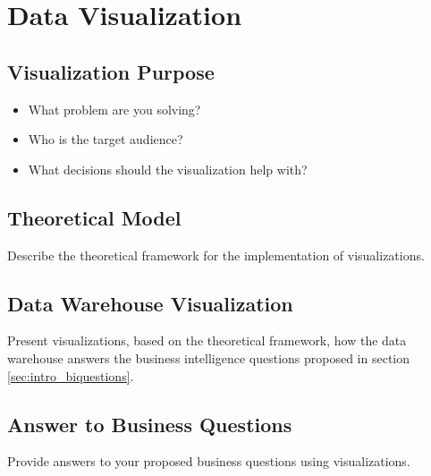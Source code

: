 \cleardoublepage%
\chapter{\label{chap:dv}Data Visualization}%


\section{\label{sec:dv_purpose}Visualization Purpose}

\begin{itemize}
    \item What problem are you solving?
\item Who is the target audience?
\item What decisions should the visualization help with?
\end{itemize}

\section{\label{sec:dv_model}Theoretical Model}

Describe the theoretical framework for the implementation of visualizations.



\section{\label{sec:dv_dl}Data Warehouse Visualization}

 Present visualizations, based on the theoretical framework, how the data warehouse answers the business intelligence questions proposed in section \ref{sec:intro_biquestions}.

\section{\label{sec:dv_bq}Answer to Business Questions}

Provide answers to your proposed business questions using visualizations.

